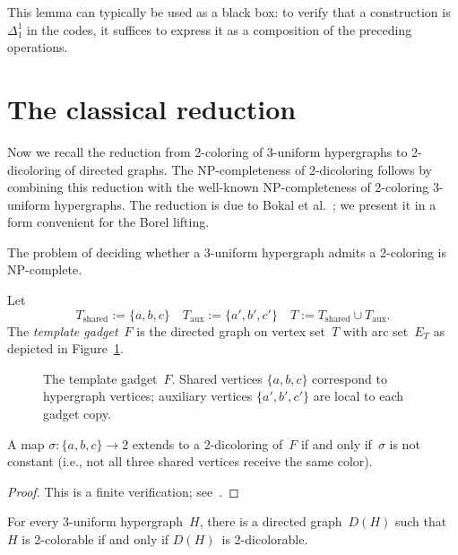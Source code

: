 \documentclass[12pt]{article}
\begin{document}
This lemma can typically be used as a black box: to verify that a construction is $\Delta^1_1$ in the codes, it suffices to express it as a composition of the preceding operations.

\section{The classical reduction}\label{sec:classical}

Now we recall the reduction from 2-coloring of 3-uniform hypergraphs to 2-dicoloring of directed graphs.
The NP-completeness of 2-dicoloring follows by combining this reduction with the well-known NP-completeness of 2-coloring 3-uniform hypergraphs.
The reduction is due to Bokal et al.~\cite{Bokal_2004_CircularChrom}; we present it in a form convenient for the Borel lifting.

\begin{fact}\label{fact:hyp-np}
	The problem of deciding whether a 3-uniform hypergraph admits a 2-coloring is NP-complete.
\end{fact}
 
\begin{definition}\label{def:gadget}
	Let $$T_{\mathrm{shared}}:=\{a,b,c\}\quad T_{\mathrm{aux}}:=\{a',b',c'\}\quad T:=T_{\mathrm{shared}}\cup T_{\mathrm{aux}}.$$
	The \emph{template gadget}~$F$ is the directed graph on vertex set~$T$ with arc set~$E_T$ as depicted in Figure~\ref{fig:gadget}.
\end{definition}

\begin{figure}[ht]
    \centering
    
    \caption{The template gadget~$F$. Shared vertices $\{a,b,c\}$ correspond to hypergraph vertices; auxiliary vertices $\{a',b',c'\}$ are local to each gadget copy.}
    \label{fig:gadget}
\end{figure}

\begin{lemma}\label{lemma:gadget-property}
	A map $\sigma\colon\{a,b,c\}\to 2$ extends to a 2-dicoloring of~$F$ if and only if~$\sigma$ is not constant (i.e., not all three shared vertices receive the same color).
\end{lemma}

\begin{proof}
	This is a finite verification; see~\cite[Theorem~3.1]{Bokal_2004_CircularChrom}.
\end{proof}

\begin{lemma}\label{lem:classical}
For every 3-uniform hypergraph~$H$, there is a directed graph~$D(H)$ such that~$H$ is 2-colorable if and only if $D(H)$~is 2-dicolorable.
\end{lemma}
\end{document}

